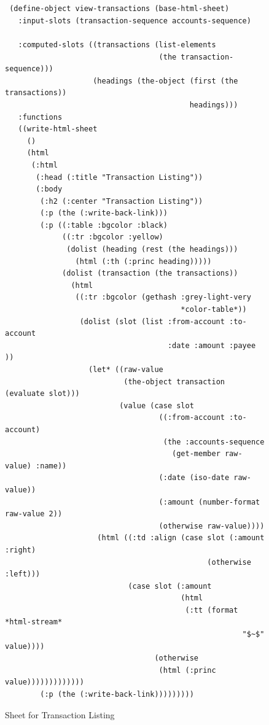 \documentclass [11pt]{book}
\begin{document}
\begin{figure}
\begin{lrbox}{\boxedverb}
\begin{minipage}{\linewidth}

\begin{verbatim}


 (define-object view-transactions (base-html-sheet)
   :input-slots (transaction-sequence accounts-sequence)

   :computed-slots ((transactions (list-elements 
                                   (the transaction-sequence)))
                    (headings (the-object (first (the transactions)) 
                                          headings)))
   :functions
   ((write-html-sheet
     ()
     (html 
      (:html 
       (:head (:title "Transaction Listing"))
       (:body 
        (:h2 (:center "Transaction Listing"))
        (:p (the (:write-back-link)))
        (:p ((:table :bgcolor :black)
             ((:tr :bgcolor :yellow) 
              (dolist (heading (rest (the headings)))
                (html (:th (:princ heading)))))
             (dolist (transaction (the transactions))
               (html 
                ((:tr :bgcolor (gethash :grey-light-very 
                                        *color-table*))
                 (dolist (slot (list :from-account :to-account 
                                     :date :amount :payee ))
                   (let* ((raw-value 
                           (the-object transaction (evaluate slot)))
                          (value (case slot 
                                   ((:from-account :to-account)
                                    (the :accounts-sequence 
                                      (get-member raw-value) :name))
                                   (:date (iso-date raw-value))
                                   (:amount (number-format raw-value 2))
                                   (otherwise raw-value))))
                     (html ((:td :align (case slot (:amount :right)
                                              (otherwise :left))) 
                            (case slot (:amount 
                                        (html 
                                         (:tt (format *html-stream* 
                                                      "$~$" value))))
                                  (otherwise 
                                   (html (:princ value)))))))))))))
        (:p (the (:write-back-link)))))))))

\end{verbatim}
\end{minipage}
\end{lrbox}
\fbox{\usebox{\boxedverb}}

\caption{Sheet for Transaction Listing}

\label{code:view-transactions-sheet}

\end{figure}
\end{document}
